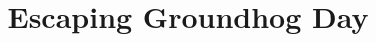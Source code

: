 \documentclass[11pt]{article} %
\title{Escaping Groundhog Day}
\author{}
\begin{document}
\maketitle

\begin{abstract}






\end{abstract}
\end{document}
